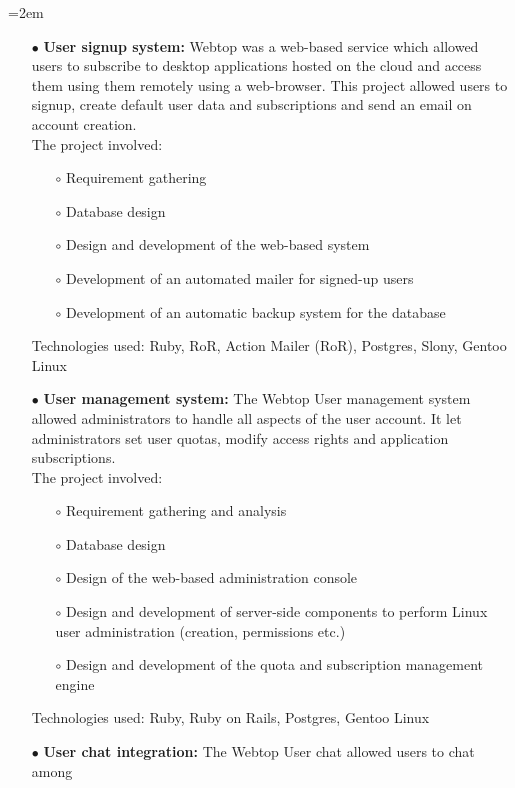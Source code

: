\documentclass{scrartcl}
\newcommand{\MarginDate}[1]{\marginpar{\raggedleft\itshape\small#1}}
\newcommand{\Description}[1]{\hangindent=2em\hangafter=0\noindent\raggedright\footnotesize{#1}\par\normalsize}
\begin{document}
\begin{cv}{
\href{http://www.develmj.com}{}
}
\Description{
\begin{itemize}
\item[\footnotesize$\bullet$] \textbf{User signup system: }Webtop was a web-based service which \MarginDate{Atlantis Webtop}allowed users to
    subscribe to desktop applications hosted on the cloud and access them using
    them remotely using a web-browser. This project allowed users to signup,
    create default user data and subscriptions and send an email on account
    creation.\\
    The project involved:
    \begin{itemize}
    \item[\footnotesize$\circ$] Requirement gathering
    \item[\footnotesize$\circ$] Database design
    \item[\footnotesize$\circ$] Design and development of the
      web-based system
    \item[\footnotesize$\circ$] Development of an automated mailer for
      signed-up users
    \item[\footnotesize$\circ$] Development of an automatic backup
      system for the database
    \end{itemize}
    Technologies used: Ruby, RoR, Action Mailer (RoR), Postgres, Slony,
Gentoo Linux
  \item[\footnotesize$\bullet$] \textbf{User management system: }The Webtop User management system allowed
administrators to handle all aspects of the user account. It let administrators
set user quotas, modify access rights and application subscriptions.\\
The project involved:
    \begin{itemize}
    \item[\footnotesize$\circ$] Requirement gathering and analysis
    \item[\footnotesize$\circ$] Database design
    \item[\footnotesize$\circ$] Design of the web-based administration console
    \item[\footnotesize$\circ$] Design and development of server-side components to perform Linux
      user administration (creation, permissions etc.)
    \item[\footnotesize$\circ$] Design and development of the quota and subscription management
engine
    \end{itemize}
    Technologies used: Ruby, Ruby on Rails, Postgres, Gentoo Linux
  \item[\footnotesize$\bullet$] \textbf{User chat integration: }The Webtop User chat allowed users to chat among

\end{itemize}}
\end{cv}
\end{document}
